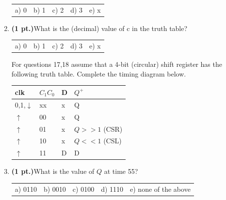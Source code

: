 \documentclass{article}
\begin{document}
\begin{enumerate}
\begin{tabular}{p{0.6in} p{0.6in} p{0.6in} p{0.6in} l}
a) 0 & b) 1 & c) 2 & d) 3 & e) x  
\end{tabular}

\item {\bf (1 pt.)}What is the (decimal) value of c in the truth table?

\begin{tabular}{p{0.6in} p{0.6in} p{0.6in} p{0.6in} l}
a) 0 & b) 1 & c) 2 & d) 3 & e) x  
\end{tabular}


\pagebreak

For questions 17,18 assume that a 4-bit (circular) shift register 
has the following truth table.   Complete the timing diagram below.

\begin{tabular}{l|l|l||l}
clk             & $C_1 C_0$     & D & $Q^+$  \\ \hline
0,1,$\downarrow$& xx            & x & Q      \\ \hline
$\uparrow$      & 00            & x & Q      \\  \hline
$\uparrow$      & 01            & x & $Q>>1$ (CSR) \\  \hline
$\uparrow$      & 10            & x & $Q<<1$ (CSL) \\  \hline
$\uparrow$      & 11            & D & D      \\
\end{tabular}


\item {\bf (1 pt.)}What is the value of $Q$ at time 55?

\begin{tabular}{p{0.6in} p{0.6in} p{0.6in} p{0.6in} l}
a) 0110 & b) 0010 & c) 0100 & d) 1110 & e) none of the above
\end{tabular}


\end{enumerate}
\end{document}
